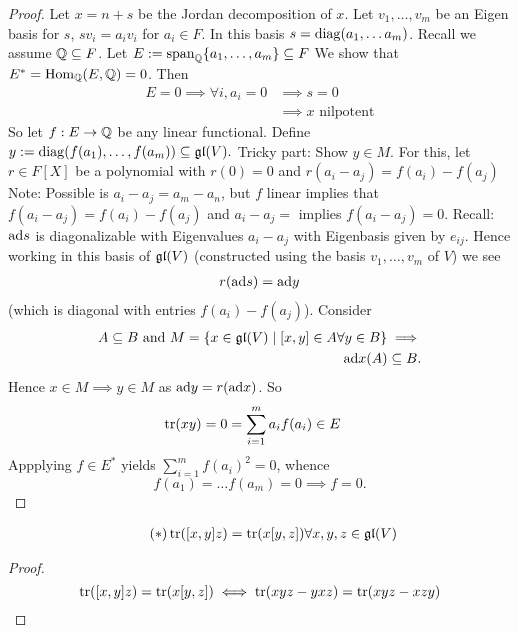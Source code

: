 \begin{proof}
    Let $x=n+s$ be the Jordan decomposition of $x$. Let $v_1, \ldots, v_m$ be an Eigen basis for $s$, $sv_i = a_i v_i$ for $a_i \in F$.
    In this basis $s= \operatorname{diag}(a_1,\ldots a_m)$. Recall we assume $\mathbb{Q} \subseteq F$.
    Let $E := \operatorname{span}_{\mathbb{Q}}\{a_1, \ldots, a_m\} \subseteq F$
    We show that $E^{\ast} = \operatorname{Hom}_{\mathbb{Q}}(E,\mathbb{Q}) = 0$. Then 
    \begin{align*}
        E = 0 \implies \forall i,a_i=0 & \implies s =0\\
        & \implies x \text{ nilpotent}
    \end{align*}
    So let $f: E \to \mathbb{Q}$ be any linear functional. Define $y := \operatorname{diag}(f(a_1), \ldots,f(a_m)) \subseteq \mathfrak{gl}(V).$
    Tricky part: Show $y \in M$. For this, let $r \in F[X]$ be a polynomial with $r(0)=0$ and $r(a_i - a_j) = f(a_i) - f(a_j)$
    Note: Possible is $a_i -a_j = a_m - a_n$, but $f$ linear implies that $f(a_i - a_j)=f(a_i)-f(a_j)$ and
    $a_i - a_j =$ implies $f(a_i - a_j) = 0$.
    Recall:  $\text{ad} s$ is diagonalizable with Eigenvalues $a_i - a_j$ with Eigenbasis given by $e_{ij}$.
    Hence working in this basis of $\mathfrak{gl}(V)$ (constructed using the basis $v_1, \ldots, v_m$ of $V$) we see 
    \begin{align*}
        r( \text{ad} s) = \text{ad} y
    \end{align*}
    (which is diagonal with entries $f(a_i) - f(a_j)$).
    Consider
    \begin{align*}
        A \subseteq B \text{ and }M = \{x \in \mathfrak{gl}(V) \mid [x,y] \in A \forall y \in B\} \implies\\
        \text{ad} x (A) \subseteq B.
    \end{align*}
    Hence $x \in M \implies y \in M$ as $\text{ad} y = r(\text{ad} x)$.
    So 
    \begin{align*}
        \operatorname{tr}(xy) = 0 & = \sum\limits_{i=1}^m a_i f(a_i) \in E
    \end{align*}
    Appplying $f \in E^{\ast}$ yields $\sum\limits_{i=1}^m f(a_i)^2 = 0$, whence
    $$ f(a_1) = \ldots f(a_m) = 0 \implies f= 0.$$
\end{proof}

\begin{lemma}
    \begin{align*}\tag{$\ast$}\label{eq:ast}
        \operatorname{tr}([x,y]z) = \operatorname{tr}(x[y,z]) \forall x,y,z \in \mathfrak{gl}(V)   
    \end{align*}
\end{lemma}
\begin{proof}
    $$\operatorname{tr}([x,y]z) = \operatorname{tr}(x[y,z]) \iff \operatorname{tr}(xyz -yxz) = \operatorname{tr} (xyz -xzy)$$
\end{proof}


